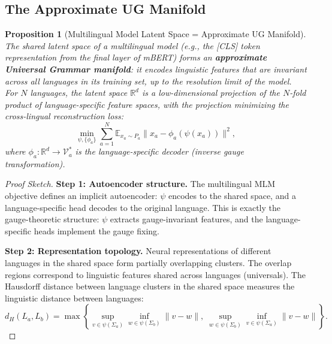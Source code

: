 \documentclass[12pt,a4paper]{article}
\newtheorem{proposition}[theorem]{Proposition}
\theoremstyle{remark}
\newcommand{\R}{\mathbb{R}}
\newcommand{\E}{\mathbb{E}}
\newcommand{\Vocab}{\mathcal{V}}
\begin{document}
\subsection{The Approximate UG Manifold}

\begin{proposition}[Multilingual Model Latent Space = Approximate UG Manifold]
\label{prop:ug_manifold}
The shared latent space of a multilingual model (e.g., the
[CLS] token representation from the final layer of mBERT)
forms an \textbf{approximate Universal Grammar manifold}:
it encodes linguistic features that are invariant across all
languages in its training set, up to the resolution limit of
the model. For $N$ languages, the latent space $\R^d$ is a
low-dimensional projection of the $N$-fold product of
language-specific feature spaces, with the projection
minimizing the cross-lingual reconstruction loss:
\begin{equation}
  \min_{\psi, \{\phi_a\}} \sum_{a=1}^N \E_{x_a \sim P_a}
    \|x_a - \phi_a(\psi(x_a))\|^2,
\end{equation}
where $\phi_a: \R^d \to \Vocab_a^*$ is the language-specific
decoder (inverse gauge transformation).
\end{proposition}

\begin{proof}[Proof Sketch]
\noindent\textbf{Step 1: Autoencoder structure.}
The multilingual MLM objective defines an implicit autoencoder:
$\psi$ encodes to the shared space, and a language-specific head
decodes to the original language. This is exactly the gauge-theoretic
structure: $\psi$ extracts gauge-invariant features, and the
language-specific heads implement the gauge fixing.

\smallskip
\noindent\textbf{Step 2: Representation topology.}
Neural representations of different languages in the shared space
form partially overlapping clusters. The overlap regions correspond
to linguistic features shared across languages (universals). The
Hausdorff distance between language clusters in the shared space
measures the linguistic distance between languages:
\begin{equation}
  d_H(L_a, L_b) = \max\left\{
    \sup_{v \in \psi(\Sigma_a)} \inf_{w \in \psi(\Sigma_b)} \|v - w\|,\;
    \sup_{w \in \psi(\Sigma_b)} \inf_{v \in \psi(\Sigma_a)} \|v - w\|
  \right\}.
\end{equation}
\end{proof}


\end{document}
